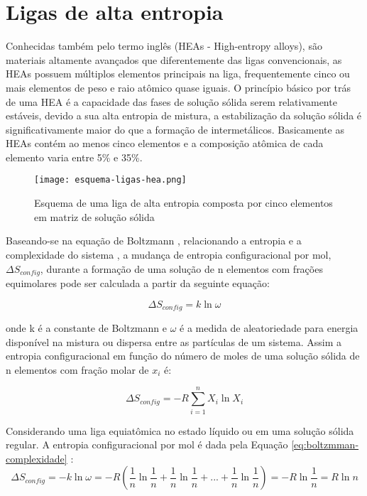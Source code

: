 \section{Ligas de alta entropia}\label{sec:LABEL_CHP_3_SEC_A}


Conhecidas também pelo termo inglês (HEAs - High-entropy alloys), são materiais altamente avançados que diferentemente das ligas convencionais, as HEAs possuem múltiplos elementos principais na liga, frequentemente cinco ou mais elementos de peso e raio atômico quase iguais. O princípio básico por trás de uma HEA é a capacidade das fases de solução sólida serem relativamente estáveis, devido a sua alta entropia de mistura, a estabilização da solução sólida é significativamente maior do que a formação de intermetálicos. Basicamente as HEAs contém ao menos cinco elementos e a composição atômica de cada elemento varia entre 5\% e 35\%. \cite{yeh2013alloy} \cite{yeh2004nanostructured}

\begin{figure}[ht]
    \centering
    \texttt{[image: esquema-ligas-hea.png]} 
    \caption{Esquema de uma liga de alta entropia composta por cinco elementos em matriz de solução sólida}
    \label{fig:esquema-ligas-hea}
\end{figure}


Baseando-se na equação de Boltzmann \cite{gaskell2012introduction}, relacionando a entropia e a complexidade do sistema \cite{thermodynamicsOfSolid}, a mudança de entropia configuracional por mol, $\Delta S_{config}$, durante a formação de uma solução  de n elementos com frações equimolares pode ser calculada a partir da seguinte equação:

\begin{equation}
    \Delta S_{config} = k \ln \omega
\end{equation}

onde k é a constante de Boltzmann e $\omega$ é a medida de aleatoriedade para energia disponível na mistura ou dispersa entre as partículas de um sistema. Assim a entropia configuracional em função do número de moles de uma solução sólida de n elementos com fração molar de $x_i$ é:

\begin{equation}
    \Delta S_{config} = - R \sum_{i=1}^{n} X_{i} \ln X_{i}
\end{equation}

Considerando uma liga equiatômica no estado líquido ou em uma solução sólida regular. A entropia configuracional por mol é dada pela Equação \ref{eq:boltzmman-complexidade} \cite{yeh2004nanostructured} \cite{yeh2013alloy}:
\begin{equation} 
\Delta S_{config} = - k \ln \omega = - R (\frac{1}{n} \ln \frac{1}{n} + \frac{1}{n} \ln \frac{1}{n} + ... + \frac{1}{n} \ln \frac{1}{n}) = -R \ln \frac{1}{n} = R \ln n
\label{eq:boltzmman-complexidade}
\end{equation}

